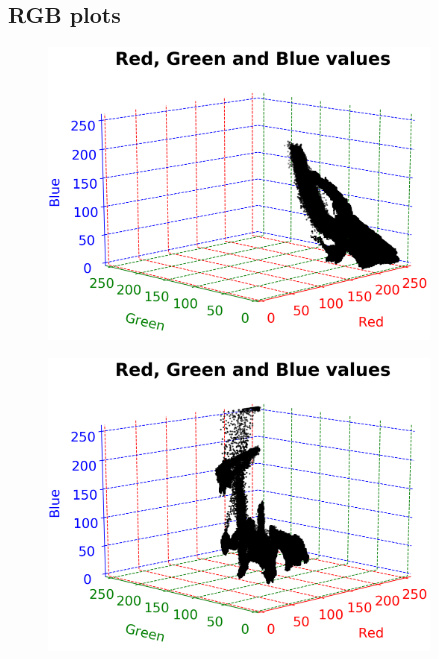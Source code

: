
\subsection{RGB plots}

\begin{figure}[h!]
	\centering
	\begin{minipage}{0.5\textwidth}
		\centering
		\includegraphics[width=0.9\textwidth]{img/rgbRed.png}
		\captionsetup{width=0.9\textwidth}
		\label{rgbRedPlot}
	\end{minipage}%
	\begin{minipage}{0.5\textwidth}
		\centering
		\includegraphics[width=0.9\textwidth]{img/rgbYellow.png}
		\captionsetup{width=0.9\textwidth}
		\label{rgbYellowPlot}
	\end{minipage}
\end{figure}


